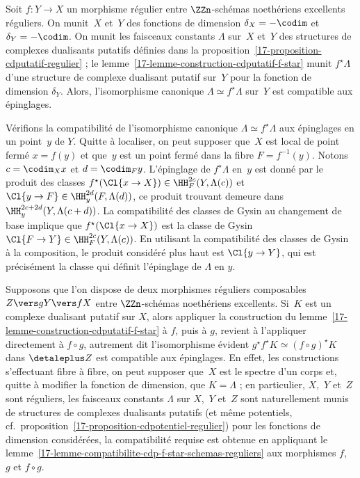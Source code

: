 \documentclass[10pt]{../fichiers-configuration-latex/smfart}
\begin{document}
\begin{lemme3}\label{17-lemme-compatibilite-cdp-f-star-schemas-reguliers}
Soit $f\colon Y\to X$ un morphisme régulier entre $\ZZn$-schémas
noethériens excellents réguliers. On munit $X$ et $Y$ des fonctions de
dimension $\delta_X=-\codim$ et $\delta_Y=-\codim$. On munit les faisceaux
constants $\Lambda$ sur $X$ et $Y$ des structures de complexes dualisants
putatifs définies dans la proposition~\ref{17-proposition-cdputatif-regulier} ;
le lemme~\ref{17-lemme-construction-cdputatif-f-star} munit $f^\star\Lambda$
d'une structure de complexe dualisant putatif sur $Y$ pour la fonction de
dimension $\delta_Y$. Alors, l'isomorphisme canonique $\Lambda\simeq
f^\star \Lambda$ sur $Y$ est compatible aux épinglages.
\end{lemme3}

Vérifions la compatibilité de l'isomorphisme canonique $\Lambda\simeq
f^\star\Lambda$ aux épinglages en un point $y$ de $Y$. Quitte à
localiser, on peut supposer que $X$ est local de point fermé $x=f(y)$ et
que $y$ est un point fermé dans la fibre $F=f^{-1}(y)$. Notons $c=\codim_X
x$ et $d=\codim_F y$. L'épinglage de $f^\star\Lambda$ en $y$ est donné par
le produit des classes $f^\star (\Cl{x\to X})\in \HH^{2c}_F(Y,\Lambda(c))$ et
$\Cl{y\to F}\in \HH^{2d}_y(F,\Lambda(d))$, ce produit trouvant demeure dans
$\HH^{2c+2d}_y(Y,\Lambda(c+d))$. La compatibilité des classes de Gysin au
changement de base implique que $f^\star(\Cl{x\to X})$ est la classe de
Gysin $\Cl{F\to Y}\in \HH^{2c}_F(Y,\Lambda(c))$. En utilisant la
compatibilité des classes de Gysin à la composition, le produit considéré
plus haut est $\Cl{y\to Y}$, qui est précisément la classe qui définit
l'épinglage de $\Lambda$ en $y$.

\begin{remarque3}
Supposons que l'on dispose de deux morphismes réguliers composables $Z\vers
g Y\vers f X$ entre  $\ZZn$-schémas noethériens excellents. Si $K$ est un
complexe dualisant putatif sur $X$, alors appliquer la construction du
lemme~\ref{17-lemme-construction-cdputatif-f-star}
à $f$, puis à $g$, revient à l'appliquer directement à $f\circ
g$, autrement dit l'isomorphisme évident $g^\star
f^\star K\simeq (f\circ g)^\star K$ dans $\detaleplus Z$ est
compatible aux épinglages. En effet, les constructions s'effectuant fibre à
fibre, on peut supposer que $X$ est le spectre d'un corps et, quitte à
modifier la fonction de dimension, que $K=\Lambda$ ;
en particulier, $X$, $Y$ et $Z$ sont réguliers, les faisceaux
constants $\Lambda$ sur $X$, $Y$ et $Z$ sont naturellement munis de
structures de complexes dualisants putatifs (et même potentiels,
cf.~proposition~\ref{17-proposition-cdpotentiel-regulier}) pour les
fonctions de dimension considérées, la compatibilité requise est
obtenue en appliquant le
lemme~\ref{17-lemme-compatibilite-cdp-f-star-schemas-reguliers} aux
morphismes $f$, $g$ et $f\circ g$.
\end{remarque3}
\end{document}
